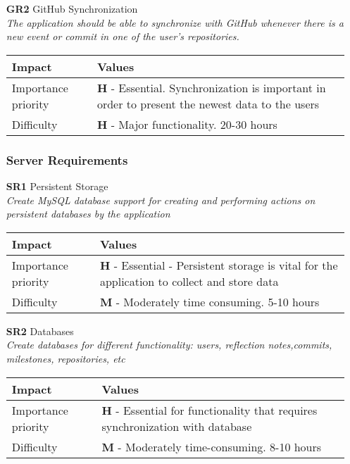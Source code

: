 \begin{itemize}
    \item[\textbf{GR2}] GitHub Synchronization\\
        \textit{\small{The application should be able to synchronize with GitHub whenever there is a new event or commit in one of the user's repositories.}}

        \begin{tabular}{| l | p{7cm} |}
            \hline
            \rowcolor[gray]{0.8}
            \textbf{Impact} & \textbf{Values} \\
            \hline
            Importance priority & \textbf{H} - Essential. Synchronization is important in order to present the newest data to the users\\
            Difficulty & \textbf{H} - Major functionality. 20-30 hours\\
            \hline
        \end{tabular}
    \vspace{0.5cm}

    \subsubsection{Server Requirements}
    \item[\textbf{SR1}] Persistent Storage\\
        \textit{\small{Create MySQL database support for creating and performing actions on persistent databases by the application}}
        \begin{tabular}{| l | p{7cm} |}
            \hline
            \rowcolor[gray]{0.8}
            \textbf{Impact} & \textbf{Values} \\
            \hline
            Importance priority & \textbf{H} - Essential - Persistent storage is vital for the application to collect and store data\\
            Difficulty & \textbf{M} - Moderately time consuming. 5-10 hours\\
            \hline
        \end{tabular}
    \vspace{0.5cm}

    \item[\textbf{SR2}] Databases\\
        \textit{\small{Create databases for different functionality: users, reflection notes,commits, milestones, repositories, etc}}

        \begin{tabular}{| l | p{7cm} |}
            \hline
            \rowcolor[gray]{0.8}
            \textbf{Impact} & \textbf{Values} \\
            \hline
            Importance priority & \textbf{H} - Essential for functionality that requires synchronization with database\\
            Difficulty & \textbf{M} - Moderately time-consuming. 8-10 hours\\
            \hline
        \end{tabular}
    \vspace{0.5cm}


\end{itemize}
